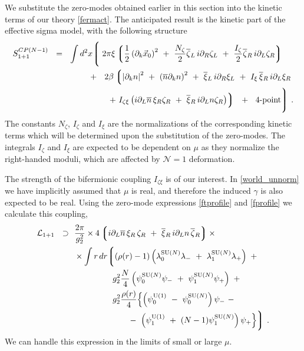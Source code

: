 \documentclass[12pt]{article}
\newcommand{\none}{${\mathcal N}=1$ }
\newcommand{\p}{\partial}
\newcommand{\ov}{\overline}
\newcommand{\mc}[1]{\mathcal{#1}}
\newcommand{\lgr}{\left\lgroup}
\newcommand{\rgr}{\right\rgroup}
\newcommand{\loN}{\lambda_0^\text{SU($N$)}}
\newcommand{\llN}{\lambda_1^\text{SU($N$)}}
\newcommand{\poU}{\psi_0^{\rm U(1)}}
\newcommand{\plU}{\psi_1^{\rm U(1)}}
\newcommand{\poN}{\psi_0^\text{SU($N$)}}
\newcommand{\plN}{\psi_1^\text{SU($N$)}}
\begin{document}
	We substitute the zero-modes obtained earlier in this section into the kinetic terms of our theory
	\ref{fermact}.
	The anticipated result is the kinetic part of the effective sigma model, with the following structure
\begin{align}
%
\label{world_unnorm}
	S_{\rm 1+1}^{CP(N-1)} ~~=~~  \int d^2x 
	\Biggl\lgroup\; 
	&
		2\pi\xi \lgr   \frac{1}{2} \left(\p_k \vec{x}_0 \right)^2
				~+~  \frac{N_{\zeta}}{2} \ov{\zeta}{}_L\, i\p_R \zeta_L 
				~+~  \frac{I_\zeta}{2} \ov{\zeta}{}_R\, i\p_L \zeta_R
			\rgr
	\\
%
\notag
	~~+~~  
	&\;
	2\beta \lgr \left|\p_k n \right|^2  ~+~ \left(\ov{n}\p_k n\right)^2  
		~+~ \ov{\xi}{}_L\, i\p_R \xi_L  ~+~  I_\xi\, \ov{\xi}{}_R\, i\p_L  \xi_R
		\right .
	\\
%
\notag
	&\;
		\left. 
		~+~ I_{\zeta\xi} 
			\left(  i\p_L\ov{n}\, \xi_R \zeta_R ~+~  \ov{\xi}{}_R \, i\p_L n \zeta_R \right)
	 \rgr
	~~+~~  \text{4-point}
	\Biggr\rgroup ~.
\end{align}
	The constants $ N_{\zeta} $, $ I_\zeta $ and $ I_\xi $ are the normalizations
	of the corresponding kinetic terms which will be determined upon the substitution of the
	zero-modes.
	The integrals $ I_\zeta $ and $ I_\xi $ are expected to be dependent on $ \mu $ as they
	normalize the right-handed moduli, which are affected by \none deformation.

	The strength of the bifermionic coupling $ I_{\zeta\xi} $ is of our interest.
	In \eqref{world_unnorm} we have implicitly assumed that $ \mu $ is real, and therefore
	the induced $ \gamma $ is also expected to be real.
	Using the zero-mode expressions \eqref{ftprofile} and \eqref{fprofile} we calculate this coupling,
\begin{align}
%
\notag
	\mc{L}_{\rm 1+1} ~~\supset~~
	&
	\frac{2\pi}{g_2^2} \times  
	4 \lgr  i\p_L \ov{n}\, \xi_R \, \zeta_R  ~+~  \ov{\xi}{}_R \, i \p_L n\, \ov{\zeta}{}_R \rgr
	\times
	\\
%
\notag
	&
	\times
	\int r\, dr 
	\biggl\lgroup  ( \rho(r)-1 ) \left( \loN \lambda_-   ~+~   \llN \lambda_+ \right) ~+~ \\
%
\label{biferm_general}
	&
	\qquad\qquad~~
	g_2^2 \frac{N}{4} \left( \poN \psi_-   ~+~   \plN \psi_+ \right)  ~+~
	\\
%
\notag
	&
	\qquad\qquad~~
	g_2^2 \frac{\rho(r)}{4} \Bigl\{ \left(\poU ~-~ \poN\right) \psi_- ~-~ \\
\notag
	&
	\qquad\qquad\qquad\;\;
	     		         	-~ \left(\plU ~+~ (N-1)\plN\right) \psi_+ \Bigr\} 
	\biggr\rgroup~.
\end{align}
	We can handle this expression in the limits of small or large $ \mu $.
\end{document}
